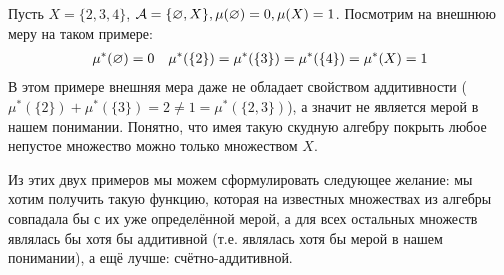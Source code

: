 \begin{example}
    Пусть $X = \{2, 3, 4\}$, $\mathcal{A} = \{\varnothing, X\}, \mu(\varnothing) = 0, \mu(X) = 1$. Посмотрим на внешнюю меру на таком
    примере:
    \begin{align*}
        &\mu^*(\varnothing) = 0 & \mu^*(\{2\}) = \mu^*(\{3\}) = \mu^*(\{4\}) = \mu^*(X) = 1
    \end{align*}
    В этом примере внешняя мера даже не обладает свойством аддитивности
    ($\mu^*(\{2\}) + \mu^*(\{3\}) = 2 \neq 1 = \mu^*(\{2, 3\})$), а значит не является мерой в нашем понимании. Понятно,
    что имея такую скудную алгебру покрыть любое непустое множество можно только множеством $X$.
\end{example}
Из этих двух примеров мы можем сформулировать следующее желание: мы хотим получить такую функцию, которая на известных
множествах из алгебры совпадала бы с их уже определённой мерой, а для всех остальных множеств являлась бы хотя бы аддитивной
(т.е. являлась хотя бы мерой в нашем понимании), а ещё лучше: счётно-аддитивной.
